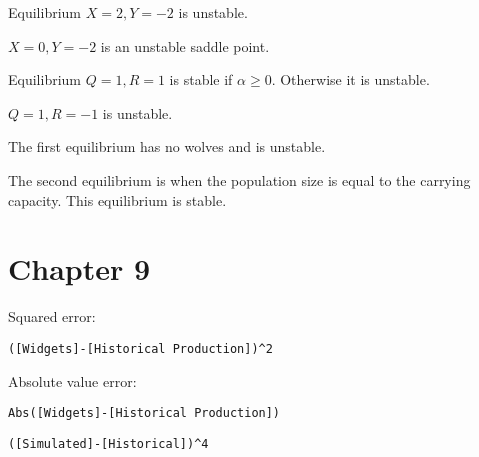 \documentclass[]{memoir}
\begin{document}

Equilibrium $X=2, Y=-2$ is unstable.

$X=0, Y=-2$ is an unstable saddle point.


Equilibrium $Q=1, R=1$ is stable if $\alpha \geq 0$. Otherwise it is
unstable.

$Q=1, R=-1$ is unstable.


The first equilibrium has no wolves and is unstable.

The second equilibrium is when the population size is equal to the
carrying capacity. This equilibrium is stable.

\section{Chapter 9}


Squared error:

\lstinline!([Widgets]-[Historical Production])^2!

Absolute value error:

\lstinline!Abs([Widgets]-[Historical Production])!


\lstinline!([Simulated]-[Historical])^4!
\end{document}
